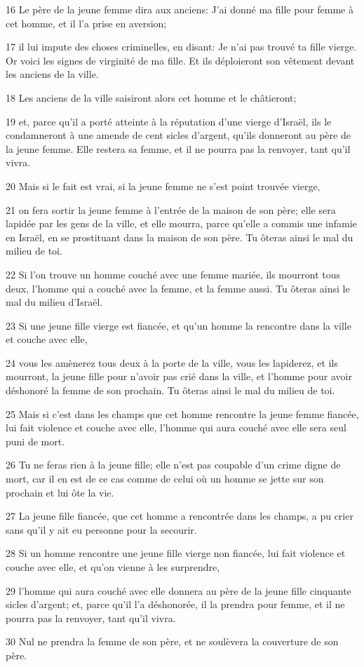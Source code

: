 \par 16 Le père de la jeune femme dira aux anciens: J'ai donné ma fille pour femme à cet homme, et il l'a prise en aversion;
\par 17 il lui impute des choses criminelles, en disant: Je n'ai pas trouvé ta fille vierge. Or voici les signes de virginité de ma fille. Et ils déploieront son vêtement devant les anciens de la ville.
\par 18 Les anciens de la ville saisiront alors cet homme et le châtieront;
\par 19 et, parce qu'il a porté atteinte à la réputation d'une vierge d'Israël, ils le condamneront à une amende de cent sicles d'argent, qu'ils donneront au père de la jeune femme. Elle restera sa femme, et il ne pourra pas la renvoyer, tant qu'il vivra.
\par 20 Mais si le fait est vrai, si la jeune femme ne s'est point trouvée vierge,
\par 21 on fera sortir la jeune femme à l'entrée de la maison de son père; elle sera lapidée par les gens de la ville, et elle mourra, parce qu'elle a commis une infamie en Israël, en se prostituant dans la maison de son père. Tu ôteras ainsi le mal du milieu de toi.
\par 22 Si l'on trouve un homme couché avec une femme mariée, ils mourront tous deux, l'homme qui a couché avec la femme, et la femme aussi. Tu ôteras ainsi le mal du milieu d'Israël.
\par 23 Si une jeune fille vierge est fiancée, et qu'un homme la rencontre dans la ville et couche avec elle,
\par 24 vous les amènerez tous deux à la porte de la ville, vous les lapiderez, et ils mourront, la jeune fille pour n'avoir pas crié dans la ville, et l'homme pour avoir déshonoré la femme de son prochain. Tu ôteras ainsi le mal du milieu de toi.
\par 25 Mais si c'est dans les champs que cet homme rencontre la jeune femme fiancée, lui fait violence et couche avec elle, l'homme qui aura couché avec elle sera seul puni de mort.
\par 26 Tu ne feras rien à la jeune fille; elle n'est pas coupable d'un crime digne de mort, car il en est de ce cas comme de celui où un homme se jette sur son prochain et lui ôte la vie.
\par 27 La jeune fille fiancée, que cet homme a rencontrée dans les champs, a pu crier sans qu'il y ait eu personne pour la secourir.
\par 28 Si un homme rencontre une jeune fille vierge non fiancée, lui fait violence et couche avec elle, et qu'on vienne à les surprendre,
\par 29 l'homme qui aura couché avec elle donnera au père de la jeune fille cinquante sicles d'argent; et, parce qu'il l'a déshonorée, il la prendra pour femme, et il ne pourra pas la renvoyer, tant qu'il vivra.
\par 30 Nul ne prendra la femme de son père, et ne soulèvera la couverture de son père.

